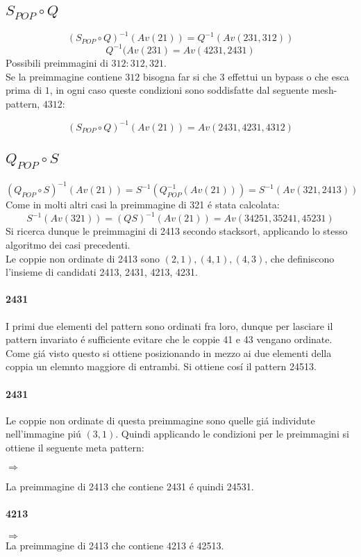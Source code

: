\subsection*{$S_{POP}\circ{Q}$}$$(S_{POP}\circ{Q})^{-1}(Av(21))=Q^{-1}(Av(231,312))$$$$Q^{-1}(Av(231)=Av(4231,2431)$$
Possibili preimmagini di $312: 312, 321$.\\
Se la preimmagine contiene $312$ bisogna far si che $3$ effettui un bypass o che esca prima di $1$, in ogni caso queste condizioni sono soddisfatte dal seguente mesh-pattern, $4312$:
\begin{center}
\end{center}
$$(S_{POP}\circ{Q})^{-1}(Av(21))=Av(2431,4231,4312)$$
\subsection*{$Q_{POP}\circ{S}$}
$$(Q_{POP}\circ{S})^{-1}(Av(21)) = S^{-1}(Q_{POP}^{-1}(Av(21))) = S^{-1}(Av(321, 2413))$$
Come in molti altri casi la preimmagine di 321 \'e stata calcolata:$$S^{-1}(Av(321)) = (QS)^{-1}(Av(21)) = Av(34251, 35241, 45231)$$
Si ricerca dunque le preimmagini di 2413 secondo stacksort, applicando lo stesso algoritmo dei casi precedenti.\\
Le coppie non ordinate di 2413 sono $(2,1),(4,1),(4,3)$, che definiscono l'insieme di candidati 2413, 2431, 4213, 4231.
\paragraph*{2431} I primi due elementi del pattern sono ordinati fra loro, dunque per lasciare il pattern invariato \'e sufficiente evitare che le coppie 41 e 43 vengano ordinate. Come gi\'a visto questo si ottiene posizionando in mezzo ai due elementi della coppia un elemnto maggiore di entrambi. Si ottiene cos\'i  il pattern 24513.
\paragraph*{2431} Le coppie non ordinate di questa preimmagine sono quelle gi\'a individute nell'immagine pi\'u $(3,1)$. Quindi applicando le condizioni per le preimmagini si ottiene il seguente meta pattern:
\begin{center}$\Rightarrow$\end{center}
La preimmagine di 2413 che contiene 2431 \'e quindi 24531.
\paragraph*{4213}\begin{center}$\Rightarrow$\\La preimmagine di 2413 che contiene 4213 \'e 42513.\end{center}

